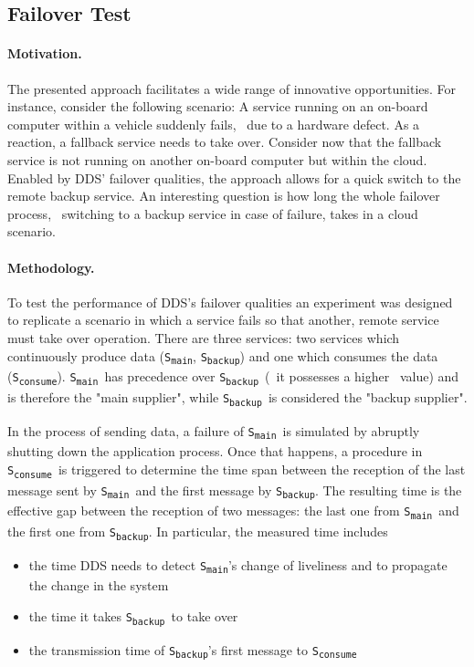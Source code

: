 %
%
%
%
%
%
%
%
%
%


\subsection{Failover Test}\label{sec:failovertest}

\paragraph{Motivation.} The presented approach facilitates a wide range of innovative opportunities. For instance, consider the following scenario: A service running on an on-board computer within a vehicle suddenly fails, \eg\ due to a hardware defect. As a reaction, a fallback service needs to take over. Consider now that the fallback service is not running on another on-board computer but within the cloud. Enabled by DDS' failover qualities, the approach allows for a quick switch to the remote backup service. An interesting question is how long the whole failover process, \ie\ switching to a backup service in case of failure, takes in a cloud scenario.


\newcommand{\proda}{\texttt{S\textsubscript{main}}}
\newcommand{\prodb}{\texttt{S\textsubscript{backup}}}
\newcommand{\cons}{\texttt{S\textsubscript{consume}}}

\paragraph{Methodology.} To test the performance of DDS's failover qualities an experiment was designed to replicate a scenario in which a service fails so that another, remote service must take over operation. There are three services: two services which continuously produce data (\proda , \prodb) and one which consumes the data (\cons). \proda\ has precedence over \prodb\ (\ie\ it possesses a higher \ownership\ value) and is therefore the "main supplier", while \prodb\ is considered the "backup supplier". 

In the process of sending data, a failure of \proda\ is simulated by abruptly shutting down the application process. Once that happens, a procedure in \cons\ is triggered to determine the time span between the reception of the last message sent by \proda\ and the first message by \prodb . The resulting time is the effective gap between the reception of two messages: the last one from \proda\ and the first one from \prodb . In particular, the measured time includes
\begin{itemize}
  \item the time DDS needs to detect \proda 's change of liveliness and to propagate the change in the system
  \item the time it takes \prodb\ to take over
  \item the transmission time of \prodb 's first message to \cons
\end{itemize} 

